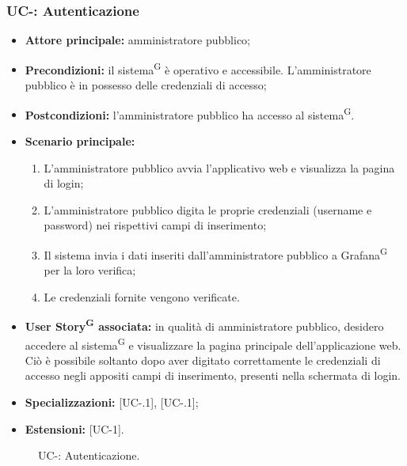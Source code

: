 \documentclass[8pt]{article}
\newcommand{\glossterm}[1]{#1\textsuperscript{G}} %
\begin{document}
\subsubsection*{UC-\ucnumber: Autenticazione} 
\begin{itemize}
    \item \textbf{Attore principale:} amministratore pubblico;
    \item \textbf{Precondizioni:} il \glossterm{sistema} è operativo e accessibile. L'amministratore pubblico è in possesso delle credenziali di accesso;
    \item \textbf{Postcondizioni:} l'amministratore pubblico ha accesso al \glossterm{sistema}.
    \item \textbf{Scenario principale:} 
        \begin{enumerate}
        \item L'amministratore pubblico avvia l'applicativo web e visualizza la pagina di login;
        \item L'amministratore pubblico digita le proprie credenziali (username e password) nei rispettivi campi di inserimento;
        \item Il sistema invia i dati inseriti dall'amministratore pubblico a \glossterm{Grafana} per la loro verifica;
        \item Le credenziali fornite vengono verificate.
        \end{enumerate}
    \item \textbf{\glossterm{User Story} associata:} in qualità di amministratore pubblico, desidero accedere al \glossterm{sistema} e visualizzare la pagina principale dell'applicazione web. Ciò è possibile soltanto dopo aver digitato correttamente le credenziali di accesso negli appositi campi di inserimento, presenti nella schermata di login.
    \item \textbf{Specializzazioni:} [UC-\theuc .1], [UC-\theuc .1];
    \item \textbf{Estensioni:} [UC-1].
\end{itemize}

\begin{figure}[ht!]
    \centering
    \caption{UC-\theuc: Autenticazione.}
    \label{fig:UC-\theuc: Autenticazione}
\end{figure}
\end{document}
